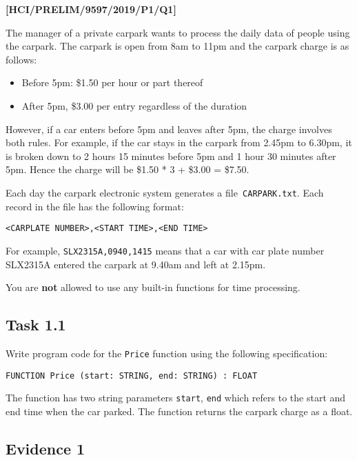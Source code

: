 \item \textbf{{[}HCI/PRELIM/9597/2019/P1/Q1{]} }

The manager of a private carpark wants to process the daily data of
people using the carpark. The carpark is open from 8am to 11pm and
the carpark charge is as follows:
\begin{itemize}
\item Before 5pm: \$1.50 per hour or part thereof 
\item After 5pm, \$3.00 per entry regardless of the duration
\end{itemize}
However, if a car enters before 5pm and leaves after 5pm, the charge
involves both rules. For example, if the car stays in the carpark
from 2.45pm to 6.30pm, it is broken down to 2 hours 15 minutes before
5pm and 1 hour 30 minutes after 5pm. Hence the charge will be \$1.50
{*} 3 + \$3.00 = \$7.50. 

Each day the carpark electronic system generates a file\texttt{ CARPARK.txt}.
Each record in the file has the following format:
\noindent \begin{center}
\texttt{<CARPLATE NUMBER>,<START TIME>,<END TIME>}
\par\end{center}

For example, \texttt{SLX2315A,0940,1415} means that a car with car
plate number SLX2315A entered the carpark at 9.40am and left at 2.15pm. 

You are \textbf{not} allowed to use any built-in functions for time
processing. 

\subsection*{Task 1.1 }

Write program code for the \texttt{Price} function using the following
specification:
\noindent \begin{center}
\texttt{FUNCTION Price (start: STRING, end: STRING) : FLOAT}
\par\end{center}

The function has two string parameters \texttt{start}, \texttt{end}
which refers to the start and end time when the car parked. The function
returns the carpark charge as a float. 

\subsection*{Evidence 1 }

